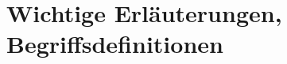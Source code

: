 \chapter{Wichtige Erläuterungen, Begriffsdefinitionen}\label{chap:Wichtige Erläuterungen, Begriffsdefinitionen}